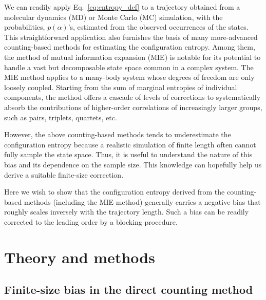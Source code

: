\documentclass[reprint, superscriptaddress]{revtex4-1}
\begin{document}
We can readily apply Eq.~\eqref{eq:entropy_def} to a trajectory
obtained from a molecular dynamics (MD) or Monte Carlo (MC) simulation,
with the probabilities, $p(\alpha)$'s,
estimated from the observed occurrences of the states.
%
This straightforward application also furnishes the basis
of many more-advanced counting-based methods for estimating the configuration entropy\cite{hnizdo2007, killian2007}.
%
Among them, the method of mutual information expansion (MIE)\cite{killian2007} is notable
for its potential to handle a vast but decomposable state space common in a complex system.
%
The MIE method applies to a many-body system
whose degrees of freedom are only loosely coupled.
%
Starting from the sum of marginal entropies of individual components,
the method offers a cascade of levels of corrections
to systematically absorb the contributions of higher-order correlations
of increasingly larger groups, such as pairs, triplets, quartets, etc.

However, the above counting-based methods
tends to underestimate the configuration entropy
because a realistic simulation of finite length
often cannot fully sample the state space.
%
Thus, it is useful to understand the nature of this bias
and its dependence on the sample size.
%
This knowledge can hopefully help us
derive a suitable finite-size correction.

Here we wish to show that the configuration entropy derived
from the counting-based methods (including the MIE method)
generally carries a negative bias
that roughly scales inversely with the trajectory length.
%
Such a bias can be readily corrected to the leading order
by a blocking procedure.
%
%



\section{Theory and methods}

\subsection{\label{sec:fsbias}
Finite-size bias in the direct counting method}
\end{document}
